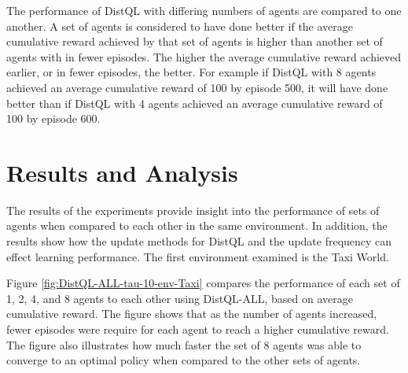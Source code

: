 \documentclass[jair,twoside,11pt,theapa]{article}
\begin{document}
The performance of DistQL with differing numbers of agents are compared to one another. A set of agents is considered to have done better if the average cumulative reward achieved by that set of agents is higher than another set of agents with in fewer episodes. The higher the average cumulative reward achieved earlier, or in fewer episodes, the better. For example if DistQL with 8 agents achieved an average cumulative reward of 100 by episode 500, it will have done better than if DistQL with 4 agents achieved an average cumulative reward of 100 by episode 600.

\section{Results and Analysis}
\label{results}
The results of the experiments provide insight into the performance of sets of agents when compared to each other in the same environment. In addition, the results show how the update methods for DistQL and the update frequency can effect learning performance. The first environment examined is the Taxi World. 

Figure \ref{fig:DistQL-ALL-tau-10-env-Taxi} compares the performance of each set of 1, 2, 4, and 8 agents to each other using DistQL-ALL, based on average cumulative reward. The figure shows that as the number of agents increased, fewer episodes were require for each agent to reach a higher cumulative reward. 
The figure also illustrates how much faster the set of 8 agents was able to converge to an optimal policy when compared to the other sets of agents.
\end{document}
